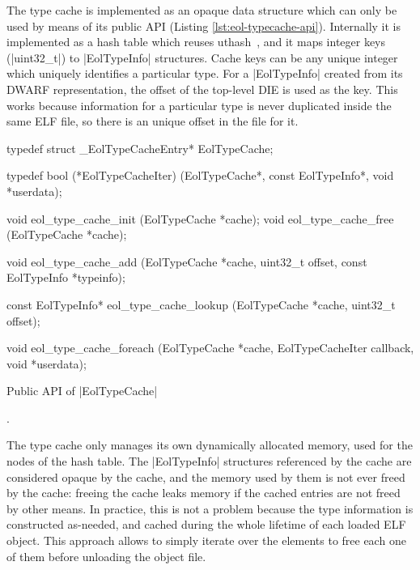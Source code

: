 The type cache is implemented as an opaque data structure which can only be
used by means of its public API (Listing \autoref{lst:eol-typecache-api}). Internally
it is implemented as a hash table which reuses uthash~\cite{uthash-guide}, and
it maps integer keys (\Mc|uint32_t|) to \Mc|EolTypeInfo| structures. Cache
keys can be any unique integer which uniquely identifies a particular type.
For a \Mc|EolTypeInfo| created from its DWARF representation, the offset of
the top-level \gls{DIE} is used as the key. This works because information for
a particular type is never duplicated inside the same ELF file, so there is an
unique offset in the file for it.

\begin{listing}[tH]
  \centering
\begin{ccode}
typedef struct _EolTypeCacheEntry* EolTypeCache;

typedef bool (*EolTypeCacheIter)  (EolTypeCache*,
                                   const EolTypeInfo*,
                                   void *userdata);

void eol_type_cache_init (EolTypeCache *cache);
void eol_type_cache_free (EolTypeCache *cache);

void eol_type_cache_add (EolTypeCache      *cache,
                         uint32_t           offset,
                         const EolTypeInfo *typeinfo);

const EolTypeInfo* eol_type_cache_lookup (EolTypeCache *cache,
                                          uint32_t      offset);

void eol_type_cache_foreach (EolTypeCache    *cache,
                             EolTypeCacheIter callback,
                             void             *userdata);
\end{ccode}
  \caption{Public API of \Mc|EolTypeCache|}.
  \label{lst:eol-typecache-api}
\end{listing}

The type cache only manages its own dynamically allocated memory, used for the
nodes of the hash table. The \Mc|EolTypeInfo| structures referenced by the
cache are considered opaque by the cache, and the memory used by them is not
ever freed by the cache: freeing the cache leaks memory if the cached entries
are not freed by other means. In practice, this is not a problem because the
type information is constructed as-needed, and cached during the whole
lifetime of each loaded ELF object. This approach allows to simply iterate
over the elements to free each one of them before unloading the object file.



